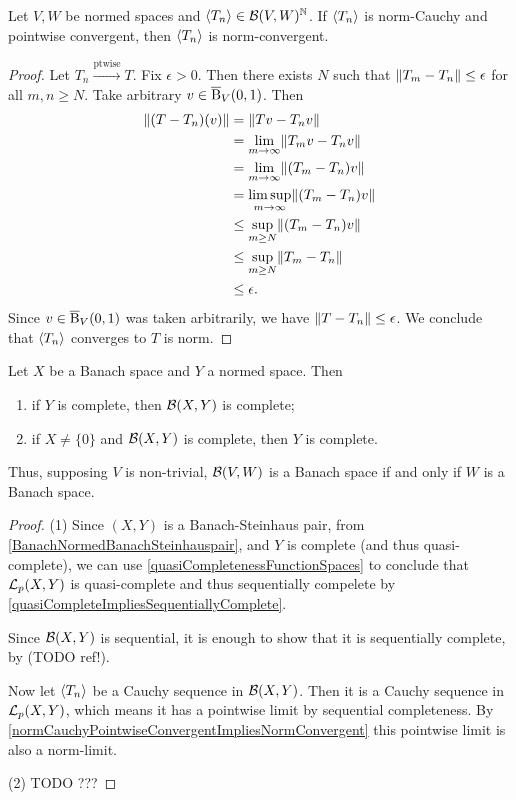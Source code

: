\begin{lemma} \label{normCauchyPointwiseConvergentImpliesNormConvergent}
Let $V,W$ be normed spaces and $\left\langle T_n \right\rangle\in\operatorname{\mathcal{B}}(V,W)^{\mathbb{N}}$. If $\left\langle T_n \right\rangle$ is norm-Cauchy and pointwise convergent, then $\left\langle T_n \right\rangle$ is norm-convergent.
\end{lemma}
\begin{proof}
Let $T_n\overset{\text{ptwise}}{\longrightarrow} T$. Fix $\epsilon > 0$. Then there exists $N$ such that $\lVert T_m-T_n\rVert\leq \epsilon$ for all $m,n\geq N$. Take arbitrary $v\in \operatorname{\overline{B}}_V(0,1)$. Then
\begin{align*}
\lVert(T-T_n)(v)\rVert &= \lVert Tv - T_nv\rVert \\
&= \lim_{m\to\infty}\lVert T_mv-T_nv\rVert \\
&= \lim_{m\to\infty}\lVert(T_m-T_n)v\rVert \\
&= \limsup_{m\to\infty}\lVert(T_m-T_n)v\rVert \\
&\leq \sup_{m\geq N}\lVert(T_m-T_n)v\rVert \\
&\leq \sup_{m\geq N}\lVert T_m-T_n\rVert \\
&\leq \epsilon.
\end{align*}
Since $v\in \operatorname{\overline{B}}_V(0,1)$ was taken arbitrarily, we have $\lVert T-T_n\rVert \leq \epsilon$. We conclude that $\left\langle T_n \right\rangle$ converges to $T$ is norm.
\end{proof}

\begin{proposition} \label{boundedOperatorsFormBanachSpace}
Let $X$ be a Banach space and $Y$ a normed space. Then
\begin{enumerate}
\item if $Y$ is complete, then $\operatorname{\mathcal{B}}(X,Y)$ is complete;
\item if $X\neq \{0\}$ and $\operatorname{\mathcal{B}}(X,Y)$ is complete, then $Y$ is complete.
\end{enumerate}
\end{proposition}
Thus, supposing $V$ is non-trivial, $\operatorname{\mathcal{B}}(V,W)$ is a Banach space \textup{if and only if} $W$ is a Banach space.
\begin{proof}
(1) Since $(X,Y)$ is a Banach-Steinhaus pair, from \ref{BanachNormedBanachSteinhauspair}, and $Y$ is complete (and thus quasi-complete), we can use \ref{quasiCompletenessFunctionSpaces} to conclude that $\operatorname{\mathcal{L}}_p(X,Y)$ is quasi-complete and thus sequentially compelete by \ref{quasiCompleteImpliesSequentiallyComplete}.

Since $\operatorname{\mathcal{B}}(X,Y)$ is sequential, it is enough to show that it is sequentially complete, by (TODO ref!).

Now let $\left\langle T_n \right\rangle$ be a Cauchy sequence in $\operatorname{\mathcal{B}}(X,Y)$. Then it is a Cauchy sequence in  $\operatorname{\mathcal{L}}_p(X,Y)$, which means it has a pointwise limit by sequential completeness. By \ref{normCauchyPointwiseConvergentImpliesNormConvergent} this pointwise limit is also a norm-limit.

(2) TODO ???
\end{proof}



